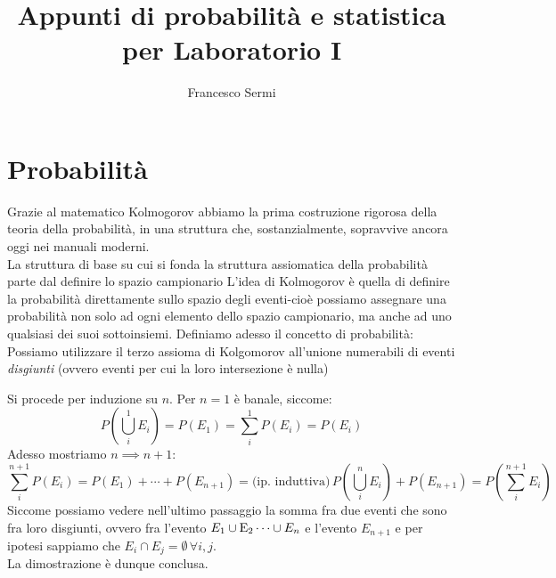 \documentclass{report}
\title{Appunti di probabilità e statistica per Laboratorio I}
\author{Francesco Sermi}
\date{}
\begin{document}
	\maketitle
	\tableofcontents
	\newpage
	\chapter{Probabilità}
	Grazie al matematico Kolmogorov abbiamo la prima costruzione rigorosa della teoria della probabilità, in una struttura che, sostanzialmente, sopravvive ancora oggi nei manuali moderni. \\
	La struttura di base su cui si fonda la struttura assiomatica della probabilità parte dal definire lo spazio campionario
\noindent L'idea di Kolmogorov è quella di definire la probabilità direttamente sullo spazio degli eventi-cioè possiamo assegnare una probabilità non solo ad ogni elemento dello spazio campionario, ma anche ad uno qualsiasi dei suoi sottoinsiemi.
	Definiamo adesso il concetto di probabilità:
\noindent Possiamo utilizzare il terzo assioma di Kolgomorov all'unione numerabili di eventi \emph{disgiunti} (ovvero eventi per cui la loro intersezione è nulla)
	\begin{myproof}
	Si procede per induzione su $n$. Per $n = 1$ è banale, siccome:
	$$
		P \left( \bigcup_i^1 E_i \right) = P(E_1) = \sum_i^1 P(E_i) = P(E_i)
	$$
	Adesso mostriamo $n \implies n+1$:
	$$
		\sum_i^{n+1} P(E_i) = P(E_1) + \cdots + P(E_{n+1}) = \text{(ip. induttiva)} \, P \left(\bigcup_i^n E_i \right) + P(E_{n+1}) = P \left( \sum_{i}^{n+1} E_i \right)
	$$
	Siccome possiamo vedere nell'ultimo passaggio la somma fra due eventi che sono fra loro disgiunti, ovvero fra l'evento $E_1 \cup \operatorname{E}_2 \cdots \cup E_n$ e l'evento $E_{n+1}$ e per ipotesi sappiamo che $E_i \cap E_j = \emptyset \, \forall i,j$. \\
	La dimostrazione è dunque conclusa.
	\end{myproof}
\end{document}
